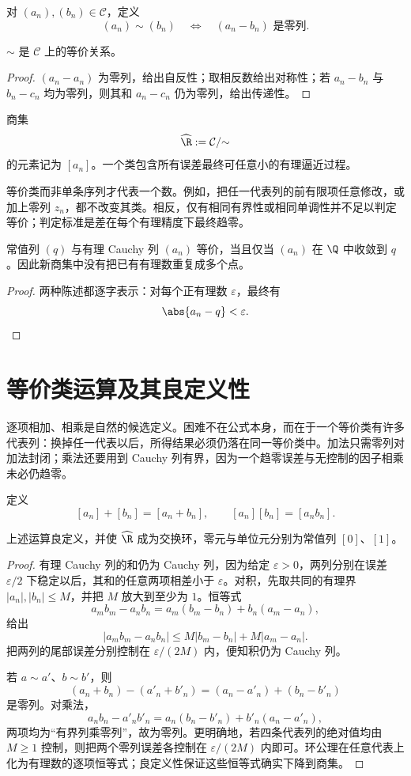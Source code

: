 对 \((a_n),(b_n)\in\mathcal C\)，定义
\[
 (a_n)\sim(b_n)\quad\Longleftrightarrow\quad(a_n-b_n)\text{ 是零列}.
\]

\begin{proposition}
\(\sim\) 是 \(\mathcal C\) 上的等价关系。
\end{proposition}

\begin{proof}
\((a_n-a_n)\) 为零列，给出自反性；取相反数给出对称性；若 \(a_n-b_n\) 与 \(b_n-c_n\) 均为零列，则其和 \(a_n-c_n\) 仍为零列，给出传递性。
\end{proof}

商集
\[
 \widehat{\R}:=\mathcal C/{\sim}
\]
的元素记为 \([a_n]\)。一个类包含所有误差最终可任意小的有理逼近过程。

等价类而非单条序列才代表一个数。例如，把任一代表列的前有限项任意修改，或加上零列 \(z_n\)，都不改变其类。相反，仅有相同有界性或相同单调性并不足以判定等价；判定标准是差在每个有理精度下最终趋零。

\begin{proposition}
常值列 \((q)\) 与有理 Cauchy 列 \((a_n)\) 等价，当且仅当 \((a_n)\) 在 \(\Q\) 中收敛到 \(q\)。因此新商集中没有把已有有理数重复成多个点。
\end{proposition}

\begin{proof}
两种陈述都逐字表示：对每个正有理数 \(\varepsilon\)，最终有
\[
 \abs{a_n-q}<\varepsilon.
\]
\end{proof}

\section{等价类运算及其良定义性}

逐项相加、相乘是自然的候选定义。困难不在公式本身，而在于一个等价类有许多代表列：换掉任一代表以后，所得结果必须仍落在同一等价类中。加法只需零列对加法封闭；乘法还要用到 Cauchy 列有界，因为一个趋零误差与无控制的因子相乘未必仍趋零。


定义
\[
 [a_n]+[b_n]=[a_n+b_n],\qquad
 [a_n][b_n]=[a_nb_n].
\]

\begin{theorem}
上述运算良定义，并使 \(\widehat{\R}\) 成为交换环，零元与单位元分别为常值列 \([0]\)、\([1]\)。
\end{theorem}

\begin{proof}
有理 Cauchy 列的和仍为 Cauchy 列，因为给定 \(\varepsilon>0\)，两列分别在误差 \(\varepsilon/2\) 下稳定以后，其和的任意两项相差小于 \(\varepsilon\)。对积，先取共同的有理界 \(|a_n|,|b_n|\le M\)，并把 \(M\) 放大到至少为 \(1\)。恒等式
\[
 a_mb_m-a_nb_n=a_m(b_m-b_n)+b_n(a_m-a_n),
\]
给出
\[
 |a_mb_m-a_nb_n|
 \le M|b_m-b_n|+M|a_m-a_n|.
\]
把两列的尾部误差分别控制在 \(\varepsilon/(2M)\) 内，便知积仍为 Cauchy 列。

若 \(a\sim a'\)、\(b\sim b'\)，则
\[
 (a_n+b_n)-(a'_n+b'_n)=(a_n-a'_n)+(b_n-b'_n)
\]
是零列。对乘法，
\[
 a_nb_n-a'_nb'_n=a_n(b_n-b'_n)+b'_n(a_n-a'_n),
\]
两项均为“有界列乘零列”，故为零列。更明确地，若四条代表列的绝对值均由 \(M\ge1\) 控制，则把两个零列误差各控制在 \(\varepsilon/(2M)\) 内即可。环公理在任意代表上化为有理数的逐项恒等式；良定义性保证这些恒等式确实下降到商集。
\end{proof}

